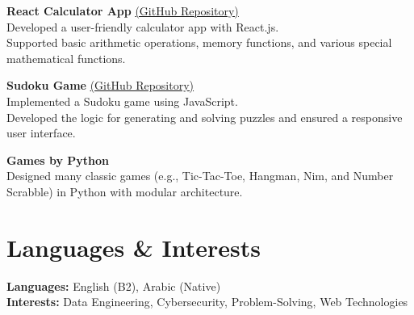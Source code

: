 \documentclass[a4paper,10pt]{article}
\begin{document}
\textbf{React Calculator App} \href{https://github.com/YassenAli/Calculator}{(GitHub Repository)}  \\
\textbullet{}\hspace{2mm} Developed a user-friendly calculator app with React.js.  \\
\textbullet{}\hspace{2mm} Supported basic arithmetic operations, memory functions, and various special mathematical functions.

\textbf{Sudoku Game} \href{https://github.com/YassenAli/Sudoku-Game}{(GitHub Repository)}  \\
\textbullet{}\hspace{2mm} Implemented a Sudoku game using JavaScript.  \\
\textbullet{}\hspace{2mm} Developed the logic for generating and solving puzzles and ensured a responsive user interface.

\textbf{Games by Python}  \\
\textbullet{}\hspace{2mm} Designed many classic games (e.g., Tic-Tac-Toe, Hangman, Nim, and Number Scrabble) in Python with modular architecture.


\section*{Languages \& Interests}
\textbf{Languages:} English (B2), Arabic (Native) \\
\textbf{Interests:} Data Engineering, Cybersecurity, Problem-Solving, Web Technologies
\end{document}
